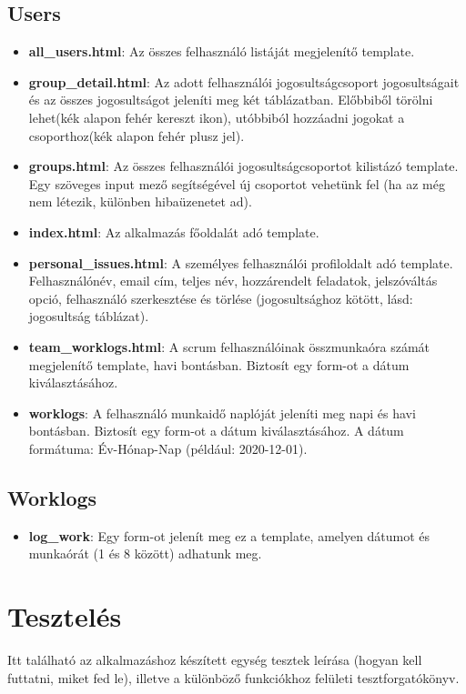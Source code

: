 \subsection{Users}
\begin{itemize}
	\item \textbf{all\_users.html}: Az összes felhasználó listáját megjelenítő template.
	\item \textbf{group\_detail.html}: Az adott felhasználói jogosultságcsoport jogosultságait és az összes jogosultságot jeleníti meg két táblázatban. Előbbiből törölni lehet(kék alapon fehér kereszt ikon), utóbbiból hozzáadni jogokat a csoporthoz(kék alapon fehér plusz jel).
	\item \textbf{groups.html}: Az összes felhasználói jogosultságcsoportot kilistázó template. Egy szöveges input mező segítségével új csoportot vehetünk fel (ha az még nem létezik, különben hibaüzenetet ad).
	\item \textbf{index.html}: Az alkalmazás főoldalát adó template.
	\item \textbf{personal\_issues.html}: A személyes felhasználói profiloldalt adó template. Felhasználónév, email cím, teljes név, hozzárendelt feladatok, jelszóváltás opció, felhasználó szerkesztése és törlése (jogosultsághoz kötött, lásd: jogosultság táblázat).
	\item \textbf{team\_worklogs.html}: A scrum felhasználóinak összmunkaóra számát megjelenítő template, havi bontásban. Biztosít egy form-ot a dátum kiválasztásához.
	\item \textbf{worklogs}: A felhasználó munkaidő naplóját jeleníti meg napi és havi bontásban. Biztosít egy form-ot a dátum kiválasztásához. A dátum formátuma: Év-Hónap-Nap (például: 2020-12-01).
\end{itemize}
\subsection{Worklogs}
\begin{itemize}
	\item \textbf{log\_work}: Egy form-ot jelenít meg ez a template, amelyen dátumot és munkaórát (1 és 8 között) adhatunk meg.
\end{itemize}

\section{Tesztelés}

Itt található az alkalmazáshoz készített egység tesztek leírása (hogyan kell futtatni, miket fed le), illetve a különböző funkciókhoz felületi tesztforgatókönyv.


